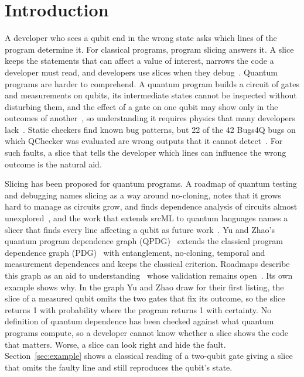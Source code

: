 \section{Introduction}\label{sec:intro}

A developer who sees a qubit end in the wrong state asks which lines of the program determine it. For
classical programs, program slicing answers it. A slice keeps the statements that can affect a value of
interest, narrows the code a developer must read, and developers use slices when they
debug~\cite{weiser1982programmers}. Quantum programs are harder to comprehend. A quantum program builds a
circuit of gates and measurements on qubits, its intermediate states cannot be inspected without disturbing
them, and the effect of a gate on one qubit may show only in the outcomes of
another~\cite{svore2018qsharp, ali2022sequantum, murillo2025roadmap}, so understanding it requires physics
that many developers lack~\cite{daloisio2024llm}. Static checkers find known bug
patterns, but 22 of the 42 Bugs4Q bugs on which QChecker was evaluated are wrong outputs that it cannot
detect~\cite{zhao2023qchecker}. For such faults, a slice that tells the developer which lines can influence
the wrong outcome is the natural aid.

Slicing has been proposed for quantum programs. A roadmap of quantum testing and debugging names slicing
as a way around no-cloning, notes that it grows hard to manage as circuits grow, and finds dependence
analysis of circuits almost unexplored~\cite{ramalho2025road}, and the work that extends srcML to quantum
languages names a slicer that finds every line affecting a qubit as future work~\cite{behler2025static}. Yu and Zhao's quantum program dependence graph
(QPDG)~\cite{yu2025qpdg} extends the classical program dependence graph (PDG)~\cite{ferrante1987pdg} with
entanglement, no-cloning, temporal and measurement dependences and keeps the classical criterion. Roadmaps
describe this graph as an aid to understanding~\cite{murillo2025roadmap} whose validation remains
open~\cite{ye2026llmqse}. Its own example shows why. In the graph Yu and Zhao draw for their first
listing, the slice of a measured qubit omits the two gates that fix its outcome, so the slice returns 1
with probability \numYzFigSliceProb{} where the program returns 1 with certainty. No definition of quantum dependence has been checked against what quantum
programs compute, so a developer cannot know whether a slice shows the code that matters. Worse, a slice
can look right and hide the fault. Section~\ref{sec:example} shows a classical reading of a
two-qubit gate giving a slice that omits the faulty line and still reproduces the qubit's state.

